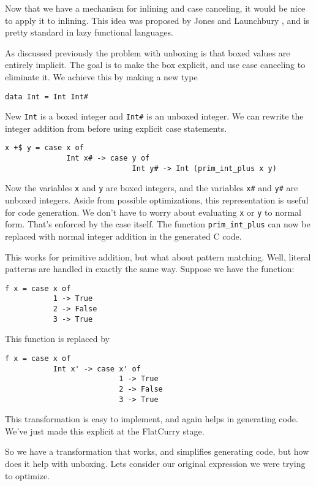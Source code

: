 \documentclass{article}
\begin{document}
Now that we have a mechanism for inlining and case canceling,
it would be nice to apply it to inlining.
This idea was proposed by Jones and Launchbury \cite{unboxing},
and is pretty standard in lazy functional languages.

As discussed previously the problem with unboxing is that boxed values are entirely implicit.
The goal is to make the box explicit, and use case canceling to eliminate it.
We achieve this by making a new type
\begin{verbatim}
data Int = Int Int#
\end{verbatim}
New \texttt{Int} is a boxed integer and \texttt{Int\#} is an unboxed integer.
We can rewrite the integer addition from before using explicit case statements.
\begin{verbatim}
x +$ y = case x of
              Int x# -> case y of
                             Int y# -> Int (prim_int_plus x y)
\end{verbatim}

Now the variables \texttt x and \texttt y are boxed integers,
and the variables \texttt{x\#} and \texttt{y\#} are unboxed integers.
Aside from possible optimizations, this representation is useful for code generation.
We don't have to worry about evaluating \texttt x or \texttt y to normal form.
That's enforced by the case itself.
The function \texttt{prim\_int\_plus} can now be replaced with normal integer addition in the generated C code.

This works for primitive addition, but what about pattern matching.
Well, literal patterns are handled in exactly the same way.
Suppose we have the function:
\begin{verbatim}
f x = case x of
           1 -> True
           2 -> False
           3 -> True
\end{verbatim}

This function is replaced by 
\begin{verbatim}
f x = case x of
           Int x' -> case x' of
                          1 -> True
                          2 -> False
                          3 -> True
\end{verbatim}

This transformation is easy to implement, and again helps in generating code.
We've just made this explicit at the FlatCurry stage.

So we have a transformation that works, and simplifies generating code, but how does it help with unboxing.
Lets consider our original expression we were trying to optimize.
\end{document}
